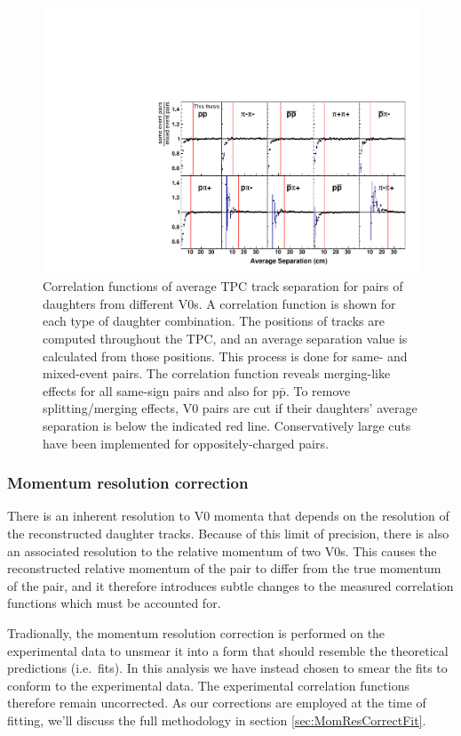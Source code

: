 \begin{figure}[hbtp]
\includegraphics[width=36pc]{Figures/Cuts/2016-9-4-AllAvgSepCFs.pdf}
\caption[Average separation of V0 daughters]{
Correlation functions of average TPC track separation for pairs of daughters from different V0s. A correlation function is shown for each type of daughter combination. The positions of tracks are computed throughout the TPC, and an average separation value is calculated from those positions. This process is done for same- and mixed-event pairs. The correlation function reveals merging-like effects for all same-sign pairs and also for p$\bar{\mathrm{p}}$. To remove splitting/merging effects, V0 pairs are cut if  their daughters' average separation is below the indicated red line. Conservatively large cuts have been implemented for oppositely-charged pairs.}
\label{fig:AverageSeparationAllPairs}
\end{figure}

\subsubsection{Momentum resolution correction}
\label{sec:MomentumResCorrectionCF}

There is an inherent resolution to V0 momenta that depends on the resolution of the reconstructed daughter tracks.  
Because of this limit of precision, there is also an associated resolution to the relative momentum of two V0s.
This causes the reconstructed relative momentum of the pair to differ from the true momentum of the pair, and it therefore introduces subtle changes to the measured correlation functions which must be accounted for.

Tradionally, the momentum resolution correction is performed on the experimental data to unsmear it into a form that should resemble the theoretical predictions (i.e.\ fits). 
In this analysis we have instead chosen to smear the fits to conform to the experimental data. 
The experimental correlation functions therefore remain uncorrected. 
As our corrections are employed at the time of fitting, we'll discuss the full methodology in section \ref{sec:MomResCorrectFit}.